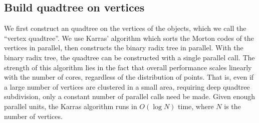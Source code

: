 \documentclass[submission]{gmp2017}
\begin{document}
%
%

\subsection{Build quadtree on vertices}

We first construct an quadtree on the vertices of the objects, which we call the ``vertex quadtree''. We use Karras' algorithm \cite{karras2012maximizing} which sorts the Morton codes of the vertices in parallel, then constructs the binary radix tree in parallel. With the binary radix tree, the quadtree can be constructed with a single parallel call. The strength of this algorithm lies in the fact that overall performance scales linearly with the number of cores, regardless of the distribution of points. That is, even if a large number of vertices are clustered in a small area, requiring deep quadtree subdivision, only a constant number of parallel calls need be made. Given enough parallel units, the Karras algorithm runs in $O(\log{N})$ time, where $N$ is the number of vertices.
\end{document}
